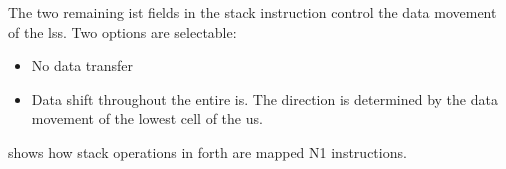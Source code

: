\begin{samepage}
The two remaining \gls{ist} fields in the stack instruction control the data movement of the \glspl{ls}.
Two options are selectable:
\begin{itemize}
  \item No data transfer
  \item Data shift throughout the entire \gls{is}. The direction is determined by the data movement of the lowest
        cell of the \gls{us}.
\end{itemize}
\end{samepage}

 shows how \gls{stack} operations in \gls{forth} are mapped N1 instructions. 

\begingroup
\setlength{\LTleft}{-20cm plus -1fill}
\setlength{\LTright}{\LTleft}

